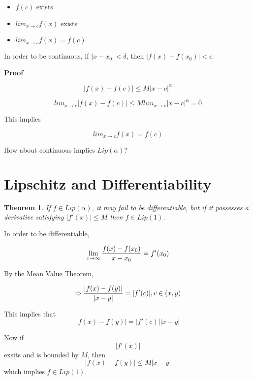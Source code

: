 \documentclass{article}
\newtheorem{thm}{Theorem}
\begin{document}
\begin{itemize}
\item $f(c)$ exists
\item $lim_{x \rightarrow c} f(x)$ exists
\item $lim_{x \rightarrow c} f(x) = f(c)$
\end{itemize}

In order to be continuous, if $|x - x_{0}| < \delta$, then $|f(x) - f(x_{0})| < \epsilon$.

\textbf{Proof}

\begin{displaymath}
|f(x) - f(c)| \leq M |x - c|^\alpha
\end{displaymath}

\begin{displaymath}
lim_{x \rightarrow c} |f(x) - f(c)| \leq M lim_{x \rightarrow c} |x -c|^\alpha = 0
\end{displaymath}

This implies 

\begin{displaymath}
lim_{x \rightarrow c} f(x) = f(c)
\end{displaymath}

How about continuous implies $Lip(\alpha)$?


\section{Lipschitz and Differentiability}

\begin{thm}
If $f \in Lip (\alpha)$, it may fail to be differentiable, but if it 
possesses a derivative satisfying $|f'(x)| \le M$ then $f \in Lip(1)$.  
\end{thm}

In order to be differentiable, 

\begin{displaymath}
\lim_{x \rightarrow \infty} {f(x) - f(x_0) \over x - x_0} = f'(x_0)
\end{displaymath}

By the Mean Value Theorem,

\begin{displaymath}
\Rightarrow {\left|f(x) - f(y)\right| \over \left|x-y\right|} = |f'(c)|, c \in (x,y)
\end{displaymath}

This implies that $$|f(x) - f(y)| = |f'(c)| |x-y|$$

Now if $$|f'(x)|$$ exsits and is bounded by $M$, then $$|f(x) - f(y)| \le M |x-y|$$ which implies $f \in Lip(1)$.  
\end{document}
